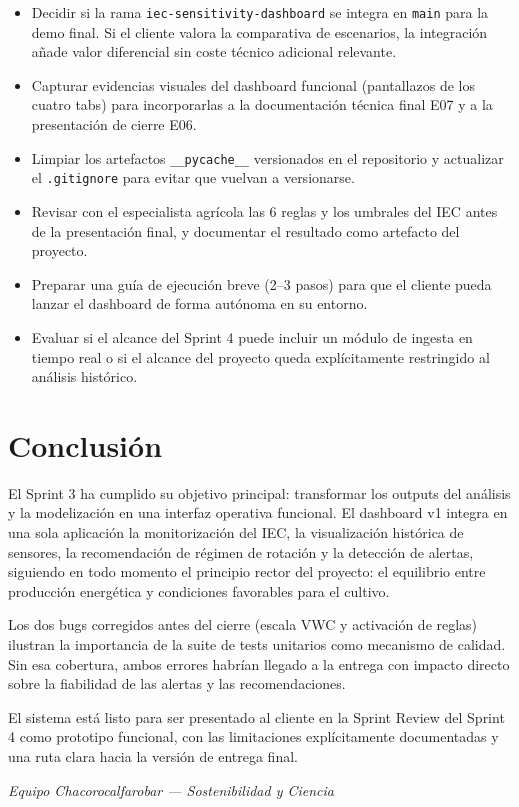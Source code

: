 \documentclass[11pt,a4paper]{article}
\begin{document}
\begin{itemize}
  \item Decidir si la rama \texttt{iec-sensitivity-dashboard} se integra en \texttt{main} para la
    demo final. Si el cliente valora la comparativa de escenarios, la integración añade valor
    diferencial sin coste técnico adicional relevante.
  \item Capturar evidencias visuales del dashboard funcional (pantallazos de los cuatro tabs)
    para incorporarlas a la documentación técnica final E07 y a la presentación de cierre E06.
  \item Limpiar los artefactos \texttt{\_\_pycache\_\_} versionados en el repositorio y actualizar
    el \texttt{.gitignore} para evitar que vuelvan a versionarse.
  \item Revisar con el especialista agrícola las 6 reglas y los umbrales del IEC antes de la
    presentación final, y documentar el resultado como artefacto del proyecto.
  \item Preparar una guía de ejecución breve (2–3 pasos) para que el cliente pueda lanzar el
    dashboard de forma autónoma en su entorno.
  \item Evaluar si el alcance del Sprint 4 puede incluir un módulo de ingesta en tiempo real
    o si el alcance del proyecto queda explícitamente restringido al análisis histórico.
\end{itemize}

\section{Conclusión}

El Sprint 3 ha cumplido su objetivo principal: transformar los outputs del análisis y la
modelización en una interfaz operativa funcional. El dashboard v1 integra en una sola
aplicación la monitorización del IEC, la visualización histórica de sensores, la
recomendación de régimen de rotación y la detección de alertas, siguiendo en todo momento
el principio rector del proyecto: el equilibrio entre producción energética y condiciones
favorables para el cultivo.

Los dos bugs corregidos antes del cierre (escala VWC y activación de reglas) ilustran la
importancia de la suite de tests unitarios como mecanismo de calidad. Sin esa cobertura,
ambos errores habrían llegado a la entrega con impacto directo sobre la fiabilidad de las
alertas y las recomendaciones.

El sistema está listo para ser presentado al cliente en la Sprint Review del Sprint 4 como
prototipo funcional, con las limitaciones explícitamente documentadas y una ruta clara
hacia la versión de entrega final.

\vspace{2em}
\begin{center}
  \textit{Equipo Chacorocalfarobar — Sostenibilidad y Ciencia}
\end{center}
\end{document}
